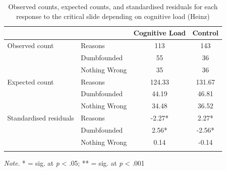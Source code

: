\documentclass[
  american,
  man,floatsintext]{apa7}
\begin{document}
\begin{table}[tbp]

\begin{center}
\begin{threeparttable}

\caption{\label{tab:tabS6tab1dumbHeinz}Observed counts, expected counts, and standardised residuals for each response to the critical slide depending on cognitive load (Heinz)}

\begin{tabular}{llcc}
\toprule
 & \multicolumn{1}{c}{} & \multicolumn{1}{c}{Cognitive Load} & \multicolumn{1}{c}{Control}\\
\midrule
Observed count & Reasons & 113 & 143\\
 & Dumbfounded & 55 & 36\\
 & Nothing Wrong & 35 & 36\\
Expected count & Reasons & 124.33 & 131.67\\
 & Dumbfounded & 44.19 & 46.81\\
 & Nothing Wrong & 34.48 & 36.52\\
Standardised residuals & Reasons & -2.27* & 2.27*\\
 & Dumbfounded & 2.56* & -2.56*\\
 & Nothing Wrong & 0.14 & -0.14\\
\bottomrule
\addlinespace
\end{tabular}

\begin{tablenotes}[para]
\normalsize{\textit{Note.} * = sig. at \emph{p} < .05; ** = sig. at \emph{p} < .001}
\end{tablenotes}

\end{threeparttable}
\end{center}

\end{table}

\newpage

~

\newpage

~

\newpage

~

\newpage

~

\newpage

~

\newpage

~

\newpage
\end{document}
